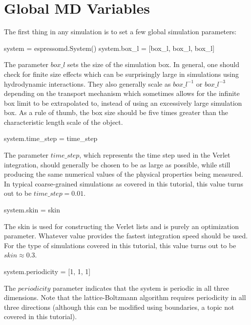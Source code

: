 \documentclass[
paper=a4,                       %
fontsize=11pt,                  %
twoside,                        %
footsepline,                    %
headsepline,                    %
headinclude=false,              %
footinclude=false,              %
pagesize,                       %
]{scrartcl}
\begin{document}
\section{Global MD Variables}\label{sec:espresso}

  The first thing in any \es{} simulation is to set a few global simulation parameters:

{\small\vspace{0,2cm}
\begin{pypresso}
system = espressomd.System()
system.box_l = [box_l, box_l, box_l]
\end{pypresso}\vspace{0,2cm}
}

The parameter $box\_l$ sets the size of the simulation box. In general, one should check for finite
size effects which can be surprisingly large in simulations using hydrodynamic interactions. They
also generally scale as $box\_l^{-1}$ or $box\_l^{-3}$ depending on the transport mechanism
which sometimes allows for the infinite box limit to be extrapolated to, instead of using an
excessively large simulation box. As a rule of thumb, the box size should be five times greater than the characteristic
length scale of the object. 
{\small\vspace{0,2cm}
\begin{pypresso}[numbers=none]
system.time_step = time_step
\end{pypresso}\vspace{0,2cm}
}
The parameter $time\_step$, which represents the time step used in the Verlet
integration, should generally be chosen to be as large as possible, while still producing the same numerical
values of the physical properties being measured. In typical coarse-grained simulations as
covered in this tutorial, this value turns out to be $time\_step=0.01$.
{\small\vspace{0,2cm}
\begin{pypresso}[numbers=none]
system.skin = skin
\end{pypresso}\vspace{0,2cm}
}
 The skin is used for constructing
the Verlet lists and is purely an optimization parameter. Whatever value provides the fastest
integration speed should be used. For the type of simulations covered in this tutorial, this value turns out
to be $skin \approx 0.3$.
{\small\vspace{0,2cm}
\begin{pypresso}[numbers=none]
system.periodicity = [1, 1, 1]
\end{pypresso}\vspace{0,2cm}
}
The $periodicity$ parameter indicates that the system is periodic in all three
dimensions. Note that the lattice-Boltzmann algorithm requires periodicity in all three directions (although
this can be modified using boundaries, a topic not covered in this tutorial). 
\end{document}
